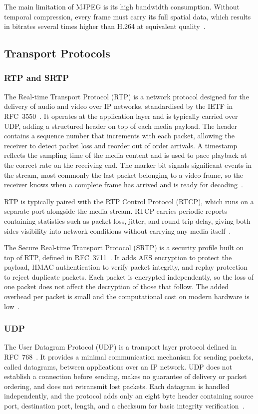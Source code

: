 The main limitation of MJPEG is its high bandwidth consumption. Without temporal compression, every frame must carry its full spatial data, which results in bitrates several times higher than H.264 at equivalent quality~\cite{kaknjo2018videolatency}.

\subsection{Transport Protocols}\label{subsec:transport-protocols}
 
\subsubsection{RTP and SRTP}\label{subsubsec:rtp-srtp}
The Real-time Transport Protocol (RTP) is a network protocol designed for the delivery of audio and video over IP networks, standardised by the IETF in RFC~3550~\cite{rfc3550}. It operates at the application layer and is typically carried over UDP, adding a structured header on top of each media payload. The header contains a sequence number that increments with each packet, allowing the receiver to detect packet loss and reorder out of order arrivals. A timestamp reflects the sampling time of the media content and is used to pace playback at the correct rate on the receiving end. The marker bit signals significant events in the stream, most commonly the last packet belonging to a video frame, so the receiver knows when a complete frame has arrived and is ready for decoding~\cite{rfc3550}.
 
RTP is typically paired with the RTP Control Protocol (RTCP), which runs on a separate port alongside the media stream. RTCP carries periodic reports containing statistics such as packet loss, jitter, and round trip delay, giving both sides visibility into network conditions without carrying any media itself~\cite{rfc3550}.
 
The Secure Real-time Transport Protocol (SRTP) is a security profile built on top of RTP, defined in RFC~3711~\cite{rfc3711}. It adds AES encryption to protect the payload, HMAC authentication to verify packet integrity, and replay protection to reject duplicate packets. Each packet is encrypted independently, so the loss of one packet does not affect the decryption of those that follow. The added overhead per packet is small and the computational cost on modern hardware is low~\cite{rfc3711}.

\subsubsection{UDP}\label{subsubsec:udp}
The User Datagram Protocol (UDP) is a transport layer protocol defined in RFC~768~\cite{rfc768}. It provides a minimal communication mechanism for sending packets, called datagrams, between applications over an IP network. UDP does not establish a connection before sending, makes no guarantee of delivery or packet ordering, and does not retransmit lost packets. Each datagram is handled independently, and the protocol adds only an eight byte header containing source port, destination port, length, and a checksum for basic integrity verification~\cite{rfc768}.
 
